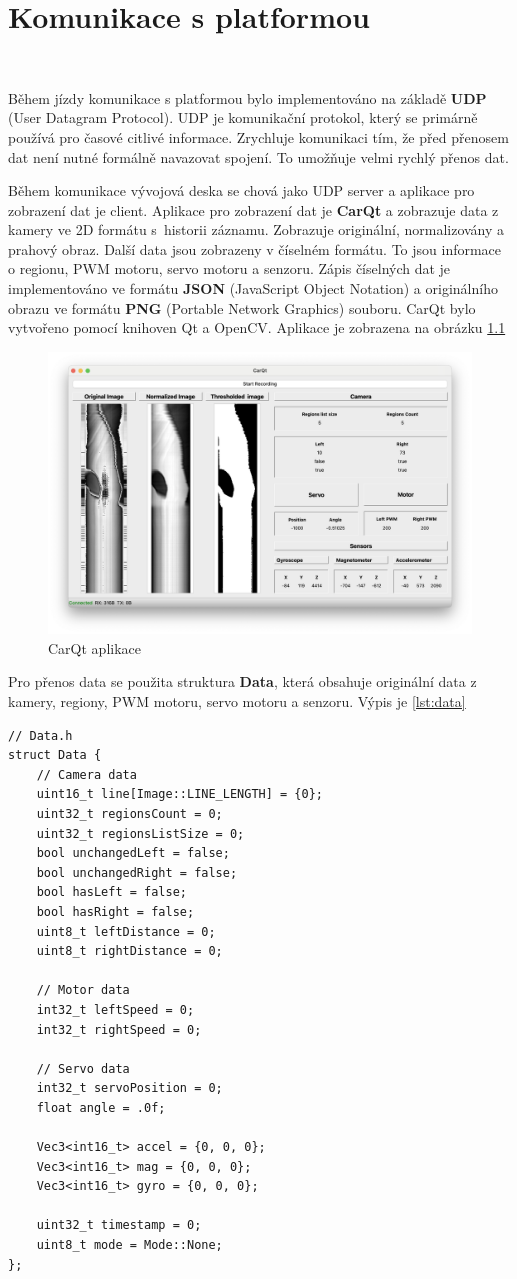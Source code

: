 \chapter{Komunikace s platformou}
\label{sec:PlatformCommunication}
\vspace{-20pt}
\

Během jízdy komunikace s platformou bylo implementováno na základě \textbf{UDP}
(User Datagram Protocol).  UDP je komunikační protokol,
který se primárně používá pro časové citlivé informace.
Zrychluje komunikaci tím, že před přenosem dat není nutné formálně navazovat spojení.
To umožňuje velmi rychlý přenos dat\cite{UDP}.

Během komunikace vývojová deska se chová jako UDP server a aplikace pro zobrazení dat
je client. Aplikace pro zobrazení dat je \textbf{CarQt} a zobrazuje data z kamery
ve 2D formátu  s~historii záznamu. Zobrazuje originální,
normalizovány a prahový obraz. Další data
jsou zobrazeny v číselném formátu. To jsou informace o regionu, PWM motoru, servo motoru
a senzoru. Zápis číselných dat je implementováno ve formátu \textbf{JSON}
(JavaScript Object Notation) a originálního obrazu ve formátu \textbf{PNG}
(Portable Network Graphics) souboru. CarQt bylo vytvořeno pomocí knihoven Qt a OpenCV.
Aplikace je zobrazena na obrázku \ref{fig:CarQt}
\begin{figure}[!h]
    \vspace{-10pt}
    \centering
    \includegraphics[width = .5\linewidth]{Figures/CarQt.png}
    \caption{CarQt aplikace}
    \label{fig:CarQt}
    \vspace{-10pt}
\end{figure}


Pro přenos data se použita struktura \textbf{Data}, která obsahuje originální data z kamery, regiony, PWM motoru, servo motoru a senzoru. Výpis je \ref{lst:data}
\begin{lstlisting}[caption=structura Data, label=lst:data]
// Data.h
struct Data {
    // Camera data
    uint16_t line[Image::LINE_LENGTH] = {0};
    uint32_t regionsCount = 0;
    uint32_t regionsListSize = 0;
    bool unchangedLeft = false;
    bool unchangedRight = false;
    bool hasLeft = false;
    bool hasRight = false;
    uint8_t leftDistance = 0;
    uint8_t rightDistance = 0;

    // Motor data
    int32_t leftSpeed = 0;
    int32_t rightSpeed = 0;

    // Servo data
    int32_t servoPosition = 0;
    float angle = .0f;

    Vec3<int16_t> accel = {0, 0, 0};
    Vec3<int16_t> mag = {0, 0, 0};
    Vec3<int16_t> gyro = {0, 0, 0};

    uint32_t timestamp = 0;
    uint8_t mode = Mode::None;
};
\end{lstlisting}

\endinput
